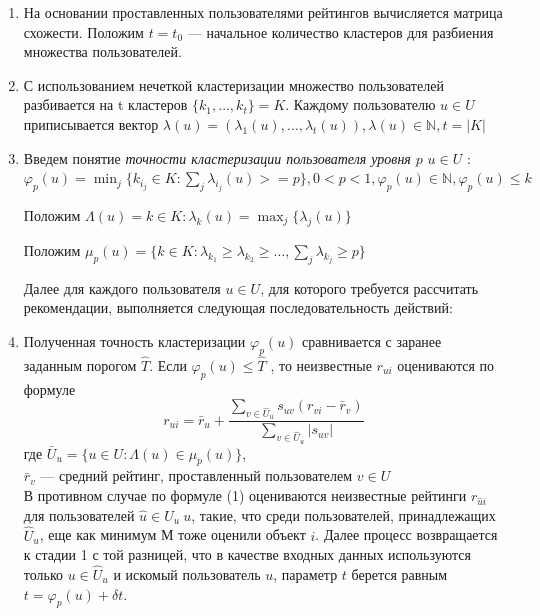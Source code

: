 \documentclass[a4paper, 12pt]{article} %
\begin{document}
\begin{enumerate} 


\item 
На основании проставленных пользователями рейтингов вычисляется матрица схожести. Положим $t = t_{0}$ --- начальное количество кластеров для разбиения множества пользователей.


\item 
С использованием нечеткой кластеризации множество пользователей разбивается на t кластеров $\{k_{1},\dots,k_{t}\}=K$.
Каждому пользователю $u \in U$ приписывается вектор $\lambda(u)=(\lambda_{1}(u),\dots,\lambda_{t}(u)), \lambda(u)\in\mathbb{N}, t=|K|$

\item
Введем понятие \textit{точности кластеризации пользователя уровня $p$} $u \in U$ :
$\varphi_{p}(u) = \min_{j} \{k_{i_{j}} \in K: \sum_{j} \lambda_{i_{j}}(u) >= p\}, 0 < p < 1, \varphi_{p}(u) \in \mathbb{N}, \varphi_{p}(u) \leq k$ 
\par
Положим $\Lambda(u) = k \in K: \lambda_{k}(u) = \max_{j} \{\lambda_{j}(u)\}$ 
\par
Положим $\mu_{p}(u) = \{k \in K: \lambda_{k_{1}} \geq\lambda_{k_{2}} \geq\dots, \sum_{j}\lambda_{k_{j}} \geq p\}$

Далее для каждого пользователя $u \in U$, для которого требуется рассчитать рекомендации, выполняется следующая последовательность действий: 

\item Полученная точность кластеризации $\varphi_{p}(u)$ сравнивается с заранее заданным порогом $\hat{T}$. Если $\varphi_{p}(u) \leq \hat{T}$ , то неизвестные $r_{ui}$ оцениваются по формуле 
\begin{equation}
	r_{ui} = \bar{r}_{u} + \frac{\sum_{v \in \hat{U}_{u}} s_{uv}(r_{vi} - \bar{r}_v)}{\sum_{v \in \hat{U}_{u}} |s_{uv}|}
\end{equation}
где $\bar{U}_{u} = \{u \in U:\Lambda(u) \in  \mu_{p}(u)\}$,\\ $\bar{r}_{v}$ --- средний рейтинг, проставленный пользователем $v \in U$\\
В противном случае по формуле (1) оцениваются неизвестные рейтинги $r_{\hat{u}i}$ для пользователей $\hat{u} \in \hat{U}_{u} \ u$, такие, что среди пользователей, принадлежащих $\hat{U}_{u}$, еще как минимум М тоже оценили объект $i$. Далее процесс возвращается к стадии 1 с той разницей, что в качестве входных данных используются только $u \in \hat{U}_{u}$ и искомый пользователь $u$, параметр $t$ берется равным $t = \varphi_{p}(u)  + \delta t$.

\end{enumerate}
\end{document}
